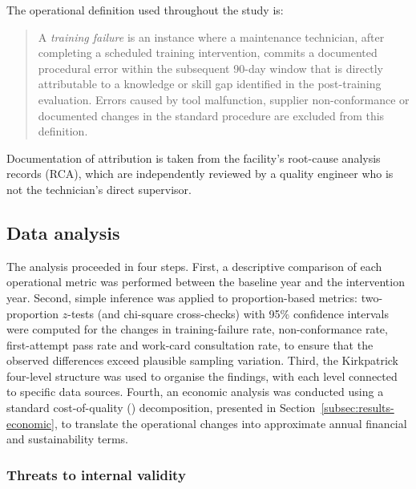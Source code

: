 The operational definition used throughout the study is:

\begin{quote}
A \textit{training failure} is an instance where a maintenance technician,
after completing a scheduled training intervention, commits a documented
procedural error within the subsequent 90-day window that is directly
attributable to a knowledge or skill gap identified in the post-training
evaluation. Errors caused by tool malfunction, supplier non-conformance or
documented changes in the standard procedure are excluded from this
definition.
\end{quote}

Documentation of attribution is taken from the facility's root-cause analysis
records (RCA), which are independently reviewed by a quality engineer
who is not the technician's direct supervisor.

\subsection{Data analysis}
\label{subsec:analysis}

The analysis proceeded in four steps. First, a descriptive comparison of
each operational metric was performed between the baseline year and the
intervention year. Second, simple inference was applied to proportion-based
metrics: two-proportion $z$-tests (and chi-square cross-checks) with 95\%
confidence intervals were computed for the changes in training-failure
rate, non-conformance rate, first-attempt pass rate and work-card
consultation rate, to ensure that the observed differences exceed plausible
sampling variation. Third, the Kirkpatrick four-level structure was used to
organise the findings, with each level connected to specific data sources.
Fourth, an economic analysis was conducted using a standard cost-of-quality
(\CoQ{}) decomposition, presented in Section~\ref{subsec:results-economic},
to translate the operational changes into approximate annual financial and
sustainability terms.

\subsubsection*{Threats to internal validity}
\label{subsubsec:validity}

